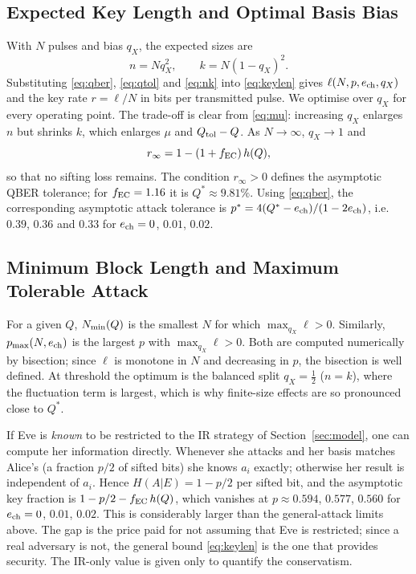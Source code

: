 \subsection{Expected Key Length and Optimal Basis Bias}
With $N$ pulses and bias $q_X$, the expected sizes are
\begin{equation}\label{eq:nk}
n=Nq_X^2,\qquad k=N(1-q_X)^2 .
\end{equation}
Substituting \eqref{eq:qber}, \eqref{eq:qtol} and \eqref{eq:nk} into \eqref{eq:keylen} gives $\ell(N,p,e_{\mathrm{ch}},q_X)$ and the key rate $r=\ell/N$ in bits per transmitted pulse. We optimise over $q_X$ for every operating point. The trade-off is clear from \eqref{eq:mu}: increasing $q_X$ enlarges $n$ but shrinks $k$, which enlarges $\mu$ and $Q_{\mathrm{tol}}-Q$. As $N\to\infty$, $q_X\to1$ and
\begin{equation}\label{eq:asym}
r_\infty=1-(1+f_{\mathrm{EC}})\,h(Q),
\end{equation}
so that no sifting loss remains. The condition $r_\infty>0$ defines the asymptotic QBER tolerance; for $f_{\mathrm{EC}}=1.16$ it is $Q^\ast\approx 9.81\%$. Using \eqref{eq:qber}, the corresponding asymptotic attack tolerance is $p^\ast=4(Q^\ast-e_{\mathrm{ch}})/(1-2e_{\mathrm{ch}})$, i.e.\ $0.39$, $0.36$ and $0.33$ for $e_{\mathrm{ch}}=0$, $0.01$, $0.02$.

\subsection{Minimum Block Length and Maximum Tolerable Attack}
For a given $Q$, $N_{\min}(Q)$ is the smallest $N$ for which $\max_{q_X}\ell>0$. Similarly, $p_{\max}(N,e_{\mathrm{ch}})$ is the largest $p$ with $\max_{q_X}\ell>0$. Both are computed numerically by bisection; since $\ell$ is monotone in $N$ and decreasing in $p$, the bisection is well defined. At threshold the optimum is the balanced split $q_X=\tfrac12$ ($n=k$), where the fluctuation term is largest, which is why finite-size effects are so pronounced close to $Q^\ast$.

\begin{remark}\label{rem:ir}
If Eve is \emph{known} to be restricted to the IR strategy of Section~\ref{sec:model}, one can compute her information directly. Whenever she attacks and her basis matches Alice's (a fraction $p/2$ of sifted bits) she knows $a_i$ exactly; otherwise her result is independent of $a_i$. Hence $H(A|E)=1-p/2$ per sifted bit, and the asymptotic key fraction is $1-p/2-f_{\mathrm{EC}}\,h(Q)$, which vanishes at $p\approx0.594$, $0.577$, $0.560$ for $e_{\mathrm{ch}}=0$, $0.01$, $0.02$. This is considerably larger than the general-attack limits above. The gap is the price paid for not assuming that Eve is restricted; since a real adversary is not, the general bound \eqref{eq:keylen} is the one that provides security. The IR-only value is given only to quantify the conservatism.
\end{remark}
